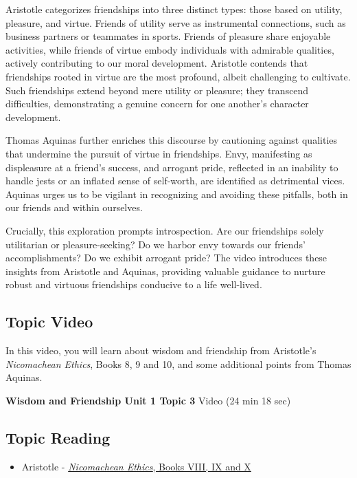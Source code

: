 \documentclass[
]{book}
\providecommand{\tightlist}{%
  \setlength{\itemsep}{0pt}\setlength{\parskip}{0pt}}
\begin{document}
Aristotle categorizes friendships into three distinct types: those based on utility, pleasure, and virtue. Friends of utility serve as instrumental connections, such as business partners or teammates in sports. Friends of pleasure share enjoyable activities, while friends of virtue embody individuals with admirable qualities, actively contributing to our moral development. Aristotle contends that friendships rooted in virtue are the most profound, albeit challenging to cultivate. Such friendships extend beyond mere utility or pleasure; they transcend difficulties, demonstrating a genuine concern for one another's character development.

Thomas Aquinas further enriches this discourse by cautioning against qualities that undermine the pursuit of virtue in friendships. Envy, manifesting as displeasure at a friend's success, and arrogant pride, reflected in an inability to handle jests or an inflated sense of self-worth, are identified as detrimental vices. Aquinas urges us to be vigilant in recognizing and avoiding these pitfalls, both in our friends and within ourselves.

Crucially, this exploration prompts introspection. Are our friendships solely utilitarian or pleasure-seeking? Do we harbor envy towards our friends' accomplishments? Do we exhibit arrogant pride? The video introduces these insights from Aristotle and Aquinas, providing valuable guidance to nurture robust and virtuous friendships conducive to a life well-lived.

\hypertarget{topic-video-2}{%
\subsection*{Topic Video}\label{topic-video-2}}

In this video, you will learn about wisdom and friendship from Aristotle's \emph{Nicomachean Ethics}, Books 8, 9 and 10, and some additional points from Thomas Aquinas.

\textbf{Wisdom and Friendship Unit 1 Topic 3} Video (24 min 18 sec)

\hypertarget{topic-reading-2}{%
\subsection*{Topic Reading}\label{topic-reading-2}}

\begin{itemize}
\tightlist
\item
  Aristotle - \href{assets/u1/PHIL-100-Aristotle-NE-VIII-IX-X.pdf}{\emph{Nicomachean Ethics}, Books VIII, IX and X}
\end{itemize}
\end{document}
